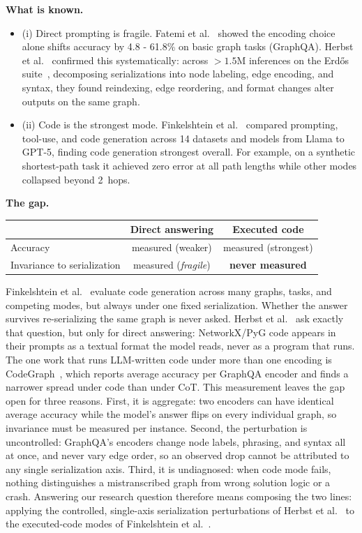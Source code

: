 \documentclass[10pt,a4paper]{article}
\newcommand{\head}[1]{\vspace{0.35em}\noindent\textbf{#1}\hspace{0.5em}}
\begin{document}
\head{What is known.}
\begin{itemize}[label={},leftmargin=1.6em,itemsep=0.35em]
\item (i) Direct prompting is fragile. Fatemi et al.~\cite{fatemi} showed the encoding choice alone shifts accuracy by 4.8 - 61.8\% on basic graph tasks (GraphQA). Herbst et al.~\cite{herbst} confirmed this systematically: across ${>}1.5$M inferences on the Erd\H{o}s suite~\cite{guo}, decomposing serializations into node labeling, edge encoding, and syntax, they found reindexing, edge reordering, and format changes alter outputs on the same graph.
\item (ii) Code is the strongest mode. Finkelshtein et al.~\cite{finkelshtein} compared prompting, tool-use, and code generation across 14 datasets and models from Llama to GPT-5, finding code generation strongest overall. For example, on a synthetic shortest-path task it achieved zero error at all path lengths while other modes collapsed beyond 2~hops.
\end{itemize}

\head{The gap.}

\begin{center}
\small
\begin{tabular}{@{}lcc@{}}
\toprule
 & \textbf{Direct answering} & \textbf{Executed code} \\
\midrule
Accuracy & measured (weaker) & measured (strongest) \\
Invariance to serialization & measured (\emph{fragile}) & \textbf{never measured} \\
\bottomrule
\end{tabular}
\end{center}

Finkelshtein et al.~\cite{finkelshtein} evaluate code generation across many graphs, tasks, and competing modes, but always under one fixed serialization. Whether the answer survives re-serializing the same graph is never asked. Herbst et al.~\cite{herbst} ask exactly that question, but only for direct answering: NetworkX/PyG code appears in their prompts as a textual format the model reads, never as a program that runs. The one work that runs LLM-written code under more than one encoding is CodeGraph~\cite{cai}, which reports average accuracy per GraphQA encoder and finds a narrower spread under code than under CoT. This measurement leaves the gap open for three reasons. First, it is aggregate: two encoders can have identical average accuracy while the model's answer flips on every individual graph, so invariance must be measured per instance. Second, the perturbation is uncontrolled: GraphQA's encoders change node labels, phrasing, and syntax all at once, and never vary edge order, so an observed drop cannot be attributed to any single serialization axis. Third, it is undiagnosed: when code mode fails, nothing distinguishes a mistranscribed graph from wrong solution logic or a crash. Answering our research question therefore means composing the two lines: applying the controlled, single-axis serialization perturbations of Herbst et al.~\cite{herbst} to the executed-code modes of Finkelshtein et al.~\cite{finkelshtein}.
\end{document}
